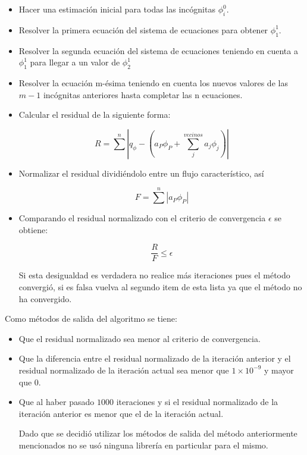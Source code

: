 \documentclass[article,latterpaper]{article}
\begin{document}
\begin{itemize}
	\item Hacer una estimación inicial para todas las incógnitas $\phi_{i}^0$.
	\item Resolver la primera ecuación del sistema de ecuaciones para obtener $\phi_{1}^1$.
	\item Resolver la segunda ecuación del sistema de ecuaciones teniendo en cuenta a $\phi_{1}^1$ para llegar a un valor de $\phi_{2}^1$
	\item Resolver la ecuación m-ésima teniendo en cuenta los nuevos valores de las $m-1$ incógnitas anteriores hasta completar las n ecuaciones.
	\item Calcular el residual de la siguiente forma:
	
	\begin{equation}
    	R=\sum^n|q_{\phi} - (a_P\phi_P + \sum_{j}^{vecinos} a_j\phi_j)|
    	\label{Res}
	\end{equation}
	
	\item Normalizar el residual dividiéndolo entre un flujo característico, así
	
	\begin{equation}
    	F=\sum^n|a_P\phi_P|
    	\label{Flujo_C}
	\end{equation}
	
	\item Comparando el residual normalizado con el criterio de convergencia $\epsilon$ se obtiene:
	
	\begin{equation}
    	\frac{R}{F}\leq\epsilon
    	\label{Res_norm}
	\end{equation}
	
	Si esta desigualdad es verdadera no realice más iteraciones pues el método convergió, si es falsa vuelva al segundo item de esta lista ya que el método no ha convergido.
\end{itemize}

Como métodos de salida del algoritmo se tiene:
\begin{itemize}
    \item Que el residual normalizado sea menor al criterio de convergencia.
    \item Que la diferencia entre el residual normalizado de la iteración anterior y el residual normalizado de la iteración actual sea menor que $1\times 10^{-9}$ y mayor que $0$.
    \item Que al haber pasado $1000$ iteraciones y si el residual normalizado de la iteración anterior es menor que el de la iteración actual.
    
Dado que se decidió utilizar los métodos de salida del método anteriormente mencionados no se usó ninguna librería en particular para el mismo.
\end{itemize}
\end{document}
